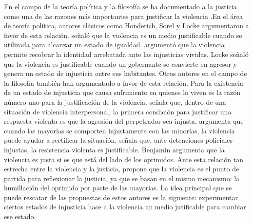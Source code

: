\documentclass[12pt,twoside]{templates/facsothesis}
\begin{document}
En el campo de la teoría política y la filosofía se ha documentado a la justicia como una de las razones más importantes para justificar la violencia \citep[i.e.][]{Runkle1976, Dean2005, Magil2008, Galtung1969, Nielsen1981, Bufacchi2007, Wells1970, Stateva2009, Frazer2019}.En el área de teoría política, autores clásicos como Honderich, Sorel y Locke argumentaron a favor de esta relación. \citet{Honderich2014} señaló que la violencia es un medio justificable cuando se utilizada para alcanzar un estado de igualdad. \citet{Sorel1999} argumentó que la violencia permite recobrar la identidad arrebatada ante las injusticias vividas. Locke \citep[en][]{Frazer2020} señaló que la violencia es justificable cuando un gobernante se convierte en agresor y genera un estado de injusticia entre sus habitantes. Otros autores en el campo de la filosofía también han argumentado a favor de esta relación. Para \citet{Wells1970} la existencia de un estado de injusticia que causa sufrimiento en quienes lo viven es la razón número uno para la justificación de la violencia. \citet{Reitan2002} señala que, dentro de una situación de violencia interpersonal, la primera condición para justificar una respuesta violenta es que la agresión del perpetrador sea injusta. \citet{Magil2008} argumenta que cuando las mayorías se comporten injustamente con las minorías, la violencia puede ayudar a rectificar la situación. \citet{Nielsen1981} señala que, ante detenciones policiales injustas, la resistencia violenta es justificable. Benjamin \citep[en][]{Stateva2009} argumenta que la violencia es justa si es que está del lado de los oprimidos. Ante esta relación tan estrecha entre la violencia y la justicia, \citet{Bufacchi2007} propone que la violencia es el punto de partida para reflexionar la justicia, ya que se basan en el mismo mecanismo: la humillación del oprimido por parte de las mayorías. La idea principal que se puede rescatar de las propuestas de estos autores es la siguiente: experimentar ciertos estados de injusticia hace a la violencia un medio jutificable para cambiar ese estado.
\end{document}
